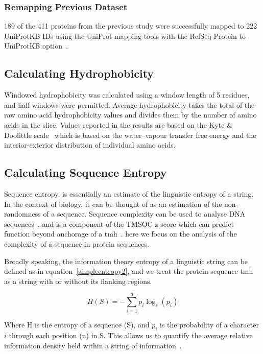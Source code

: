 \subsubsection{Remapping Previous Dataset}
189 of the 411 proteins from the previous study were successfully mapped to 222 UniProtKB IDs using the UniProt mapping tools with the RefSeq Protein to UniProtKB option~\cite{TheUniProtConsortium2014}.

\subsection{Calculating Hydrophobicity}
Windowed hydrophobicity was calculated using a window length of 5 residues, and half windows were permitted.
Average hydrophobicity takes the total of the raw amino acid hydrophobicity values and divides them by the number of amino acids in the slice.
Values reported in the results are based on the Kyte \& Doolittle scale~\cite{Kyte1982} which is based on the water\---vapour transfer free energy and the interior-exterior distribution of individual amino acids.

\subsection{Calculating Sequence Entropy}
Sequence entropy, is essentially an estimate of the linguistic entropy of a string.
In the context of biology, it can be thought of as an estimation of the non-randomness of a sequence.
Sequence complexity can be used to analyse DNA sequences~\cite{Pinho2013, Oliver1993, Troyanskaya2002}, and is a component of the TMSOC z-score which can predict function beyond anchorage of a \gls{tmh}~\cite{Wong2011, Wong2012, Baker2017}.
here we focus on the analysis of the complexity of a sequence in protein sequences.

Broadly speaking, the information theory entropy of a linguistic string can be defined as in equation~\ref{simpleentropy2}, and we treat the protein sequence \gls{tmh} as a string with or without its flanking regions.

\begin{equation} \label{simpleentropy2}
	H(S)=-{\sum_{i=1}^n {p_i\log_s(p_i)}}
\end{equation}

Where H is the entropy of a sequence (S), and $p_i$ is the probability of a character $i$ through each position (n) in S. This allows us to quantify the average relative information density held within a string of information~\cite{Shannon1948}.

